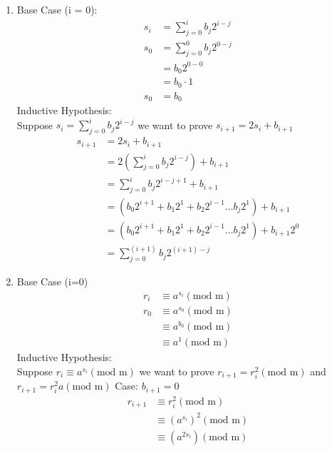 \documentclass{assignment}
\begin{document}
\begin{problemlist}
\begin{problem}
\begin{answer}
\begin{enumerate}[label=(\alph*)]
	\item Base Case (i = 0):
    	\begin{align*}
        	s_i &= \sum_{j=0}^i b_j 2^{i-j} \\
    		s_0 &= \sum_{j=0}^0 b_j 2^{0-j} \\
            	&= b_0 2^{0-0} \\
                &= b_0 \cdot 1 \\
            s_0 &= b_0
    	\end{align*}
        Inductive Hypothesis: \\
        Suppose $ s_i = \sum_{j=0}^i b_j 2^{i-j} $ we want to prove  $ s_{i+1} = 2s_i + b_{i+1} $
        \begin{align*}
        	s_{i+1} &= 2s_i + b_{i+1} \\
            		&= 2 (\sum_{j=0}^i b_j 2^{i-j}) + b_{i+1} \\
                    &= \sum_{j=0}^i b_j 2^{i-j+1} + b_{i+1} \\
                    &= (b_0 2^{i+1} + b_1 2^1 + b_2 2^{i-1} \ldots b_j 2^1) + b_{i+1} \\
                    &= (b_0 2^{i+1} + b_1 2^1 + b_2 2^{i-1} \ldots b_j 2^1) + b_{i+1} 2^0 \\
                    &= \sum_{j=0}^{(i+1)} b_j 2^{(i+1)-j}
        \end{align*}
	\item Base Case (i=0)
     	  \begin{align*}
     	  	r_i &\equiv a^{s_i} (\text{mod m}) \\
            r_0 &\equiv a^{s_0} (\text{mod m}) \\
            	&\equiv a^{b_0} (\text{mod m}) \\
                &\equiv a^1 (\text{mod m}) 
     	  \end{align*}
          Inductive Hypothesis: \\
          Suppose $ r_i \equiv a^{s_i} (\text{mod m})$ we want to prove  $ r_{i+1} = r_i^2 (\text{mod m})$ and $ r_{i+1} = r_i^2 a (\text{mod m})$ \newline \newline
          Case: $b_{i+1} = 0$
          \begin{align*}
          	r_{i+1} &\equiv r_i^2 (\text{mod m}) \\
            		&\equiv (a^{s_i})^2 (\text{mod m}) \\
                    &\equiv (a^{2s_i}) (\text{mod m})

\end{align*}
\end{enumerate}
\end{answer}
\end{problem}
\end{problemlist}
\end{document}
